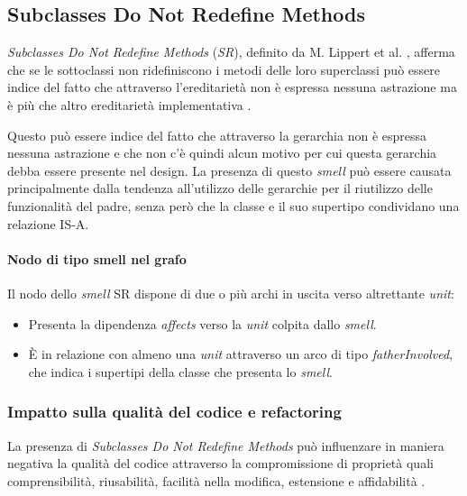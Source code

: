 \subsection{Subclasses Do Not Redefine Methods}
    \textit{Subclasses Do Not Redefine Methods} (\textit{SR}), definito da M. Lippert et al. \cite{lippert2006refactoring}, afferma che se le sottoclassi non ridefiniscono i metodi delle loro superclassi può essere indice del fatto che attraverso l'ereditarietà non è espressa nessuna astrazione ma è più che altro ereditarietà implementativa \cite{lippert2006refactoring}.
        
    Questo può essere indice del fatto che attraverso la gerarchia non è espressa nessuna astrazione e che non c'è quindi alcun motivo per cui questa gerarchia debba essere presente nel design. 
    La presenza di questo \textit{smell} può essere causata principalmente dalla tendenza all'utilizzo delle gerarchie per il riutilizzo delle funzionalità del padre, senza però che la classe e il suo supertipo condividano una relazione IS-A. 
    
    \paragraph{Nodo di tipo smell nel grafo}
    Il nodo dello \textit{smell} SR dispone di due o più archi in uscita verso altrettante \textit{unit}: 
    \begin{itemize}
        \item Presenta la dipendenza \textit{affects} verso la \textit{unit} colpita dallo \textit{smell}.
        
        \item È in relazione con almeno una \textit{unit} attraverso un arco di tipo \textit{fatherInvolved}, che indica i supertipi della classe che presenta lo \textit{smell}.
    \end{itemize}
    
    \subsubsection{Impatto sulla qualità del codice e refactoring}
        La presenza di \textit{Subclasses Do Not Redefine Methods} può influenzare in maniera negativa la qualità del codice attraverso la compromissione di proprietà quali comprensibilità, riusabilità, facilità nella modifica, estensione e affidabilità \cite{SURYANARAYANA201521}.
        
